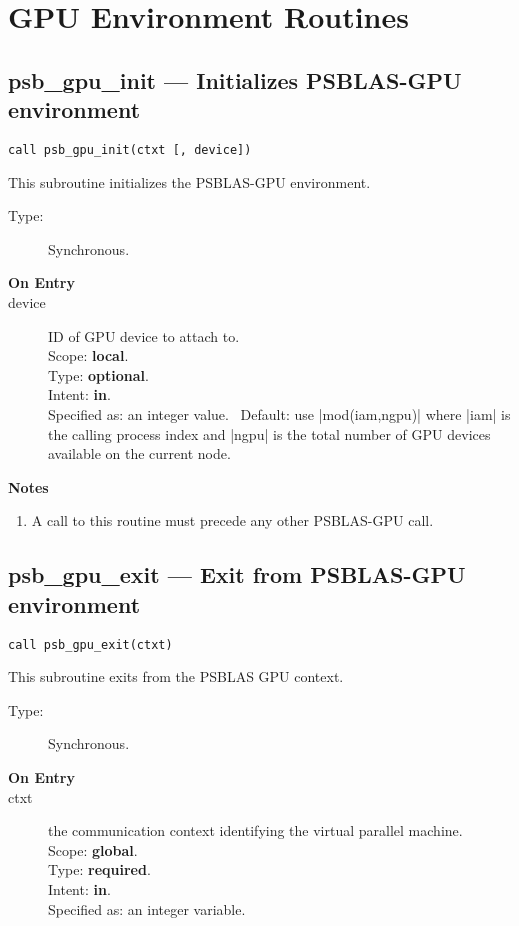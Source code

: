 
\section{GPU Environment Routines}
\label{sec:gpuenv}

\subsection*{psb\_gpu\_init --- Initializes PSBLAS-GPU
  environment}

\begin{verbatim}
call psb_gpu_init(ctxt [, device])
\end{verbatim}

This subroutine initializes the PSBLAS-GPU  environment. 
\begin{description}
\item[Type:] Synchronous.
\item[\bf  On Entry ]
\item[device] ID of GPU device to attach to.\\
Scope: {\bf local}.\\
Type: {\bf optional}.\\
Intent: {\bf in}.\\
Specified as: an integer value. \
Default: use \fortinline|mod(iam,ngpu)| where \fortinline|iam| is the calling
process index and \fortinline|ngpu| is the total number of GPU devices
available on the current node. 
\end{description}


{\par\noindent\large\bfseries Notes}
\begin{enumerate}
\item A call to this routine must precede any other PSBLAS-GPU call. 
\end{enumerate}

\subsection*{psb\_gpu\_exit --- Exit from  PSBLAS-GPU
  environment}

\begin{verbatim}
call psb_gpu_exit(ctxt)
\end{verbatim}

This subroutine exits from the  PSBLAS GPU context.
\begin{description}
\item[Type:] Synchronous.
\item[\bf  On Entry ]
\item[ctxt] the communication context identifying the virtual
  parallel machine.\\
Scope: {\bf global}.\\
Type: {\bf required}.\\
Intent: {\bf in}.\\
Specified as: an integer variable.
\end{description}




